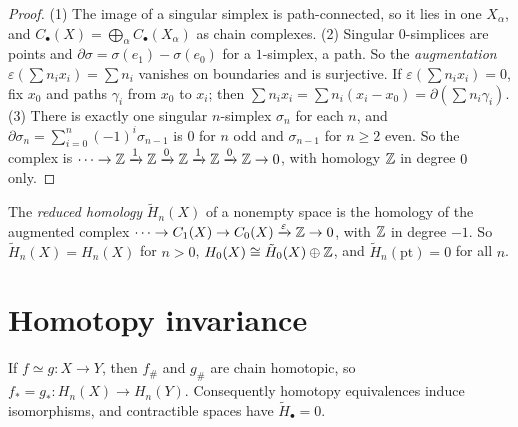 \begin{proof}
(1) The image of a singular simplex is path-connected, so it lies in one $X_\alpha$, and $C_\bullet(X) = \bigoplus_\alpha C_\bullet(X_\alpha)$ as chain complexes.
(2) Singular $0$-simplices are points and $\partial\sigma = \sigma(e_1) - \sigma(e_0)$ for a $1$-simplex, a path. So the \emph{augmentation}
$\varepsilon(\sum n_ix_i) = \sum n_i$ vanishes on boundaries and is surjective. If $\varepsilon(\sum n_ix_i) = 0$, fix $x_0$ and paths $\gamma_i$ from $x_0$
to $x_i$; then $\sum n_ix_i = \sum n_i(x_i - x_0) = \partial(\sum n_i\gamma_i)$. (3) There is exactly one singular $n$-simplex $\sigma_n$ for each $n$, and
$\partial\sigma_n = \sum_{i=0}^n(-1)^i\sigma_{n-1}$ is $0$ for $n$ odd and $\sigma_{n-1}$ for $n \geq 2$ even. So the complex is
$\cdots \to \mathbb{Z} \xrightarrow{1} \mathbb{Z} \xrightarrow{0} \mathbb{Z} \xrightarrow{1} \mathbb{Z} \xrightarrow{0} \mathbb{Z} \to 0$, with homology $\mathbb{Z}$ in degree $0$ only.
\end{proof}

\begin{definition}\label{singular-homology:definition-reduced}
The \emph{reduced homology} $\tilde{H}_n(X)$ of a nonempty space is the homology of the augmented complex
$\cdots \to C_1(X) \to C_0(X) \xrightarrow{\varepsilon} \mathbb{Z} \to 0$, with $\mathbb{Z}$ in degree $-1$. So $\tilde{H}_n(X) = H_n(X)$ for $n > 0$,
$H_0(X) \cong \tilde{H}_0(X) \oplus \mathbb{Z}$, and $\tilde{H}_n(\mathrm{pt}) = 0$ for all $n$.
\end{definition}

\section{Homotopy invariance}\label{singular-homology:section-homotopy-invariance}

\begin{theorem}\label{singular-homology:theorem-homotopy-invariance}
If $f \simeq g \colon X \to Y$, then $f_\#$ and $g_\#$ are chain homotopic, so $f_* = g_* \colon H_n(X) \to H_n(Y)$. Consequently homotopy equivalences
induce isomorphisms, and contractible spaces have $\tilde{H}_\bullet = 0$.
\end{theorem}

